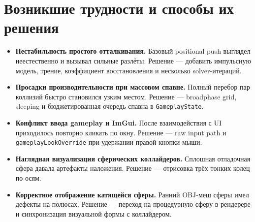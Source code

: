 \documentclass[a4paper,14pt]{extarticle}
\begin{document}
\section{Возникшие трудности и способы их решения}
\begin{itemize}
  \item \textbf{Нестабильность простого отталкивания.} Базовый positional push выглядел неестественно и вызывал сильные разлёты. Решение --- добавить импульсную модель, трение, коэффициент восстановления и несколько solver-итераций.

  \item \textbf{Просадки производительности при массовом спавне.} Полный перебор пар коллизий быстро становился узким местом. Решение --- broadphase grid, sleeping и бюджетированная очередь спавна в \texttt{GameplayState}.

  \item \textbf{Конфликт ввода gameplay и ImGui.} После взаимодействия с UI приходилось повторно кликать по окну. Решение --- raw input path и \texttt{gameplayLookOverride} при удержании правой кнопки мыши.

  \item \textbf{Наглядная визуализация сферических коллайдеров.} Сплошная отладочная сфера давала артефакты наложения. Решение --- отрисовка трёх тонких колец по осям.

  \item \textbf{Корректное отображение катящейся сферы.} Ранний OBJ-меш сферы имел дефекты на полюсах. Решение --- переход на процедурную сферу в рендерере и синхронизация визуальной формы с коллайдером.
\end{itemize}
\end{document}
